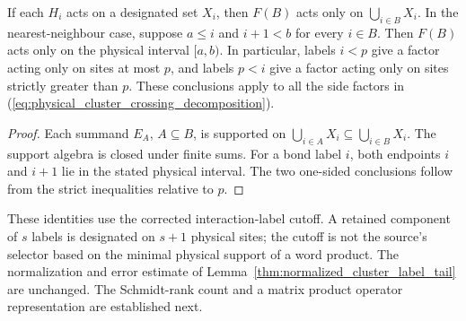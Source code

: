 \begin{lemma}
    \label{thm:retained_cluster_physical_support}
    \leanok

    If each $H_i$ acts on a designated set $X_i$, then $F(B)$ acts
    only on $\bigcup_{i\in B}X_i$. In the nearest-neighbour case,
    suppose $a\leq i$ and $i+1<b$ for every $i\in B$. Then $F(B)$
    acts only on the physical interval $[a,b)$.
    In particular, labels $i<p$ give a factor acting only on sites
    at most $p$, and labels $p<i$ give a factor acting only on sites
    strictly greater than $p$. These conclusions apply to all the
    side factors in (\ref{eq:physical_cluster_crossing_decomposition}).
\end{lemma}
\begin{proof}\leanok
    Each summand $E_A$, $A\subseteq B$, is supported on
    $\bigcup_{i\in A}X_i\subseteq\bigcup_{i\in B}X_i$.
    The support algebra is closed under finite sums. For a bond
    label $i$, both endpoints $i$ and $i+1$ lie in the stated physical
    interval. The two one-sided conclusions follow from the strict
    inequalities relative to $p$.
\end{proof}

These identities use the corrected interaction-label cutoff. A retained
component of $s$ labels is designated on $s+1$ physical sites; the cutoff
is not the source's selector based on the minimal physical support of a
word product. The normalization and error estimate of
Lemma~\ref{thm:normalized_cluster_label_tail} are unchanged. The
Schmidt-rank count and a matrix product operator representation are
established next.


